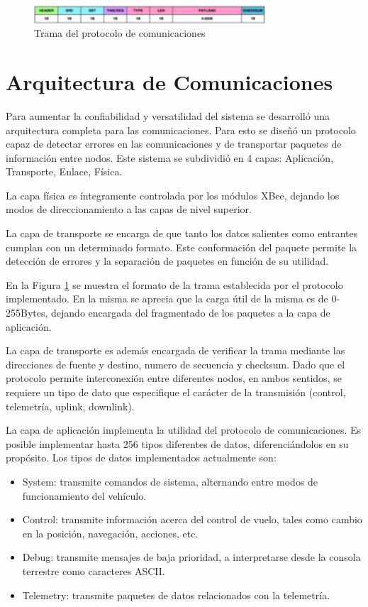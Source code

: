 \documentclass[a4paper, conference]{IEEEtran}
\begin{document}
\begin{figure}[!t]
\centering
\includegraphics[width=3.40in]{trama}
\caption{Trama del protocolo de comunicaciones}
\label{ref:trama}
\end{figure}

\section{Arquitectura de Comunicaciones}

Para aumentar la confiabilidad y versatilidad del sistema se desarrolló una arquitectura completa para las comunicaciones. Para esto se diseñó un protocolo capaz de detectar errores en las comunicaciones y de transportar paquetes de información entre nodos. Este sistema se subdividió en 4 capas: Aplicación, Transporte, Enlace, Física.

La capa física es íntegramente controlada por los módulos XBee, dejando los modos de direccionamiento a las capas de nivel superior.

La capa de transporte se encarga de que tanto los datos salientes como entrantes cumplan con un determinado formato. Este conformación del paquete permite la detección de errores y la separación de paquetes en función de su utilidad.

En la Figura \ref{ref:trama} se muestra el formato de la trama establecida por el protocolo implementado. En la misma se aprecia que la carga útil de la misma es de 0-255Bytes, dejando encargada del fragmentado de los paquetes a la capa de aplicación.

 
La capa de transporte es además encargada de verificar la trama mediante las direcciones de fuente y destino, numero de secuencia y checksum. Dado que el protocolo permite interconexión entre diferentes nodos, en ambos sentidos, se requiere un tipo de dato que especifique el carácter de la transmisión (control, telemetría, uplink, downlink).

La capa de aplicación implementa la utilidad del protocolo de comunicaciones. Es posible implementar hasta 256 tipos diferentes de datos, diferenciándolos en su propósito. Los tipos de datos implementados actualmente son:
\begin{itemize}
\item System: transmite comandos de sistema, alternando entre modos de funcionamiento del vehículo.
\item Control: transmite información acerca del control de vuelo, tales como cambio en la posición, navegación, acciones, etc.
\item Debug: transmite mensajes de baja prioridad, a interpretarse desde la consola terrestre como caracteres ASCII.
\item Telemetry: transmite paquetes de datos relacionados con la telemetría.
\end{itemize}
\end{document}
